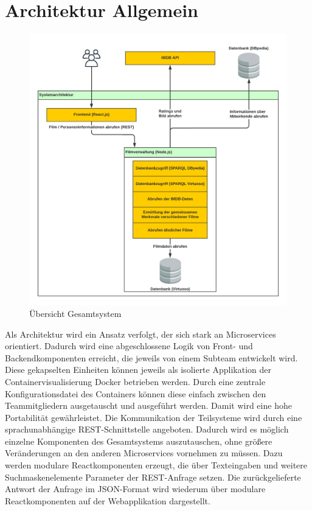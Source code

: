 \documentclass[conference]{IEEEtran}
\begin{document}
\section{Architektur Allgemein}
\begin{figure}
    \centering
    \includegraphics[width=\textwidth]{UebersichtGesamtsystem.png}
    \caption{Übersicht Gesamtsystem}
\end{figure}

Als Architektur wird ein Ansatz verfolgt, der sich stark an Microservices orientiert.
Dadurch wird eine abgeschlossene Logik von Front- und Backendkomponenten erreicht, die jeweils
von einem Subteam entwickelt wird. Diese gekapselten Einheiten können jeweils als isolierte Applikation der Containervisualisierung
Docker betrieben werden. Durch eine zentrale Konfigurationsdatei des Containers können diese einfach zwischen den Teammitgliedern
ausgetauscht und ausgeführt werden. Damit wird eine hohe Portabilität gewährleistet.
Die Kommunikation der Teilsysteme wird durch eine sprachunabhängige REST-Schnittstelle angeboten. 
Dadurch wird es möglich einzelne Komponenten des Gesamtsystems auszutauschen, ohne größere Veränderungen an den anderen 
Microservices vornehmen zu müssen.
Dazu werden modulare Reactkomponenten erzeugt, die über Texteingaben und weitere Suchmaskenelemente Parameter der REST-Anfrage setzen.
Die zurückgelieferte Antwort der Anfrage im JSON-Format wird wiederum über modulare Reactkomponenten auf der Webapplikation dargestellt.\cite{microservices}
\end{document}
